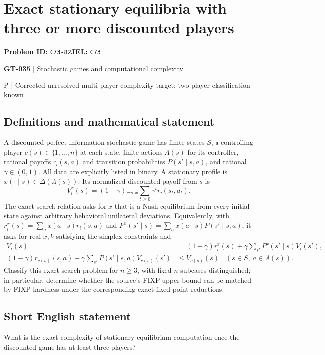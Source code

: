 \documentclass[11pt,a4paper]{article}
\begin{document}
\section*{Exact stationary equilibria with three or more discounted players}
\textbf{Problem ID:} \texttt{C73-82}\quad \textbf{JEL:} \texttt{C73}\par
\label{problem:OP-0165}
\label{game:GT-035}
{\sffamily\small\color{muted}
{\sffamily\small\color{muted}\textbf{GT-035} | Stochastic games and computational complexity\par P | Corrected unresolved multi-player complexity target; two-player classification known\par}
\par}
\subsection*{Definitions and mathematical statement}
A discounted perfect-information stochastic game has finite states $S$, a controlling player $c(s)\in\{1,\ldots,n\}$ at each state, finite actions $A(s)$ for its controller, rational payoffs $r_i(s,a)$ and transition probabilities $P(s'\mid s,a)$, and rational $\gamma\in(0,1)$. All data are explicitly listed in binary. A stationary profile is $x(\cdot\mid s)\in\Delta(A(s))$. Its normalized discounted payoff from $s$ is
\[
 V_i^x(s)=(1-\gamma)\mathbb E_{s,x}\sum_{t\geq0}\gamma^t r_i(s_t,a_t).
\]
The exact search relation asks for $x$ that is a Nash equilibrium from every initial state against arbitrary behavioral unilateral deviations. Equivalently, with
$r_i^x(s)=\sum_a x(a\mid s)r_i(s,a)$ and
$P^x(s'\mid s)=\sum_a x(a\mid s)P(s'\mid s,a)$, it asks for real $x,V$ satisfying the simplex constraints and
\begin{align*}
 V_i(s)&=(1-\gamma)r_i^x(s)+\gamma\sum_{s'}P^x(s'\mid s)V_i(s'),\\
 (1-\gamma)r_{c(s)}(s,a)+\gamma\sum_{s'}P(s'\mid s,a)V_{c(s)}(s')&\leq V_{c(s)}(s)
 \quad(s\in S,\ a\in A(s)).
\end{align*}
Classify this exact search problem for $n\geq3$, with fixed-$n$ subcases distinguished; in particular, determine whether the source's FIXP upper bound can be matched by FIXP-hardness under the corresponding exact fixed-point reductions.
\subsection*{Short English statement}
What is the exact complexity of stationary equilibrium computation once the discounted game has at least three players?
\end{document}
